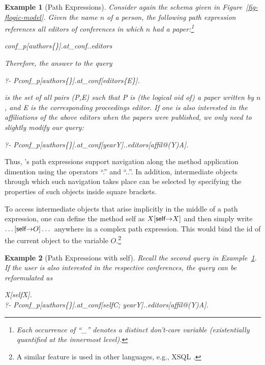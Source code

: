\documentclass[11pt]{report}
\newtheorem{example}{Example}[section]
\begin{document}
\begin{example}[Path Expressions]\label{Ex:PathExpr}
  \rm
  Consider again the schema given in Figure~\ref{fig-flogic-model}.
  Given the name $n$ of a person, the following path expression
  references all editors of conferences in which $n$ had a
  paper:\footnote{Each occurrence of ``\_'' denotes a distinct
    don't-care variable (existentially quantified at the
    innermost level).}
\begin{qrules}
  \anon\isa conf\_p[authors\mvd\{\anon [name\fd $n$]\}].at\_conf..editors
\end{qrules}
Therefore, the answer to the \emph{query}
\begin{qrules}
  ?- P\isa conf\_p[authors\mvd\{\anon [name\fd
  $n$]\}].at\_conf[editors\mvd\{E\}].
\end{qrules}
is the set of all pairs (\textsf{P},\textsf{E}) such that \textsf{P}
is (the logical oid of) a paper written by $n$, and \textsf{E} is the
corresponding proceedings editor.  If one is also interested in the
affiliations of the above editors when the papers were published, we only
need to slightly modify our query:
\begin{qrules}
  ?- P\isa conf\_p[authors\mvd\{\anon [name\fd
  $n$]\}].at\_conf[year\fd Y]..editors[affil@(Y)\fd A].
\end{qrules}
\end{example}
Thus, \FLORA's path expressions support navigation 
along the method application dimention using the operators
``.''  and
``..''. In addition, intermediate objects through which such navigation
takes place can be selected by specifying the properties of such objects
inside square brackets.

To access intermediate objects that arise implicitly in the middle
of a path expression, one can define the method \textsf{self} as
$X[\textsf{self}{\rightarrow} X]$ and then simply
write $\dots[\textsf{self}{\rightarrow} O]\dots$ anywhere in a complex
path expression. This would bind the id of the current object to the
variable $O$.\footnote{
  A similar feature is used in other
  languages, e.g., XSQL \cite{xsql-92}.
  }

\begin{example}[Path Expressions with \textsf{self}]\label{ex-path-self}
  \rm
  Recall the second query in Example~\ref{Ex:PathExpr}. If the user is
  also interested in the respective conferences, the query can be
  reformulated as
\begin{qrules}
  X[self\fd X].\\
   ?- P\isa conf\_p[authors\mvd\{\anon [name\fd
   $n$]\}].at\_conf[self\fd C; year\fd Y]..editors[affil@(Y)\fd A]. 
\end{qrules}
\end{example}
\end{document}
